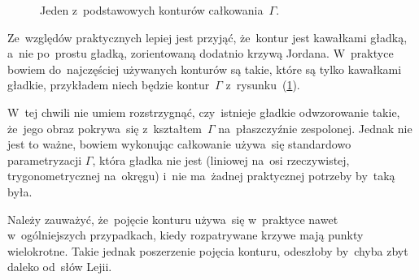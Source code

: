 \documentclass[a4paper,11pt]{article}
\begin{document}
\begin{figure}
  \centering

  
  \caption{Jeden z~podstawowych konturów całkowania~$\Gamma$.}

  \label{fig:Leja-01}
\end{figure}



\start {} Ze~względów praktycznych lepiej jest przyjąć,
że~kontur jest kawałkami gładką, a~nie po~prostu gładką, zorientowaną
dodatnio krzywą Jordana. W~praktyce bowiem do~najczęściej używanych
konturów są takie, które są tylko kawałkami gładkie, przykładem niech
będzie kontur~$\Gamma$ z~rysunku~(\ref{fig:Leja-01}).

W~tej chwili nie umiem rozstrzygnąć, czy~istnieje gładkie odwzorowanie
takie, że~jego obraz pokrywa~się z~kształtem~$\Gamma$ na~płaszczyźnie
zespolonej. Jednak nie jest to ważne, bowiem wykonując całkowanie
używa~się standardowo parametryzacji $\Gamma$, która gładka nie jest
(liniowej na~osi rzeczywistej, trygonometrycznej na~okręgu) i~nie
ma~żadnej praktycznej potrzeby by~taką była.

Należy zauważyć, że~pojęcie konturu używa~się w~praktyce nawet
w~ogólniejszych przypadkach, kiedy rozpatrywane krzywe mają punkty
wielokrotne. Takie jednak poszerzenie pojęcia konturu, odeszłoby
by~chyba zbyt daleko od~słów Lejii.
\end{document}
